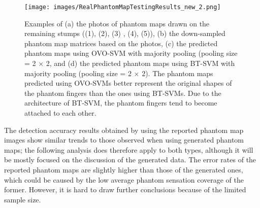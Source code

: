  \begin{figure}[hbt!]
 \centering
 \texttt{[image: images/RealPhantomMapTestingResults\_new\_2.png]}
  \caption{Examples of (a) the photos of  phantom maps drawn on the remaining stumps ((1)\cite{antfolk2012sensory}, (2)\cite{bjorkman2016sensory}, (3) \cite{chai2015characterization}, (4)\cite{chai2015characterization}, (5)\cite{bjorkman2016sensory}),  (b) the down-sampled phantom map matrices based on the photos,  (c) the predicted phantom maps using OVO-SVM with majority pooling (pooling size = 2 $\times$ 2, and (d) the predicted phantom maps using BT-SVM with majority pooling (pooling size = 2 $\times$ 2).  The phantom maps predicted using OVO-SVMs better represent the original shapes of the phantom fingers than the ones using BT-SVMs. Due to the architecture of BT-SVM, the phantom fingers tend to become attached to each other.}
  \label{fig:reported_phantom_map_classification}
 \end{figure}

The detection accuracy results obtained by using the reported phantom map images show similar trends to those observed when using generated phantom maps; the following analysis does therefore apply to both types, although it will be mostly focused on the discussion of the generated data. The error rates of the reported phantom maps are slightly higher than those of the generated ones, which could be caused by the low average phantom sensation coverage of the former. However, it is hard to draw further conclusions because of the limited sample size.




